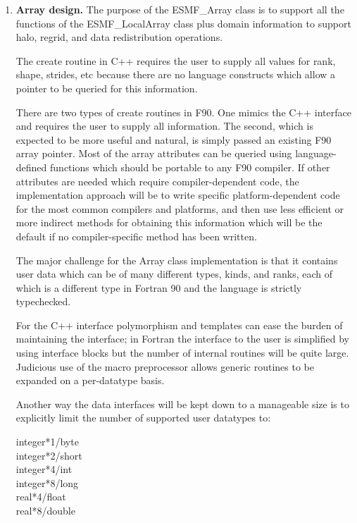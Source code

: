 \begin{enumerate}
\item{\bf Array design.}
The purpose of the ESMF\_Array class is to support all the functions of
the ESMF\_LocalArray class plus domain information to support halo,
regrid, and data redistribution operations.

The create routine in C++ requires the user to supply all values for
rank, shape, strides, etc because there are no language constructs which
allow a pointer to be queried for this information.

There are two types of create routines in F90.  One mimics the C++
interface and requires the user to supply all information.  
The second, which is expected to be more useful and natural, 
is simply passed an existing F90 array pointer.  Most of the
array attributes can be queried using language-defined functions which
should be portable to any F90 compiler.   If other attributes are needed
which require compiler-dependent code, the implementation approach
will be to write specific platform-dependent code for the most common
compilers and platforms, and then use less efficient or more indirect 
methods for obtaining this information which will be the default if 
no compiler-specific method has been written.

The major challenge for the Array class implementation is that it 
contains user data which can be of many different types, kinds,
and ranks, each of which is a different type in Fortran 90 and
the language is strictly typechecked.

For the C++ interface polymorphism and templates can ease the burden of 
maintaining the interface; in Fortran the interface to the user
is simplified by using interface blocks but the number of internal
routines will be quite large.  Judicious use of the macro preprocessor
allows generic routines to be expanded on a per-datatype basis.

Another way the data interfaces will be kept down to a manageable
size is to explicitly limit the number of supported user datatypes to:
\begin{description}
\item[integer*1/byte]
\item[integer*2/short]
\item[integer*4/int]
\item[integer*8/long]
\item[real*4/float]
\item[real*8/double]
\end{description}



\end{enumerate}
